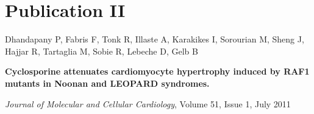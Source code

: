 \chapter*{Publication II}
\label{pubIIpage}
\vfill
Dhandapany P, Fabris F, Tonk R, Illaste A, Karakikes I, Sorourian M,
Sheng J, Hajjar R, Tartaglia M, Sobie R, Lebeche D,  Gelb B

{\bf Cyclosporine attenuates cardiomyocyte hypertrophy induced by RAF1
mutants in Noonan and LEOPARD syndromes.}

\emph{Journal of Molecular and Cellular Cardiology}, Volume 51, Issue 1, July 2011

\vfill

\renewcommand{\thepaper}{\PaperII}
\pagebreak
\vspace*{3cm}\thispagestyle{empty}
\pagebreak

\newcommand{\PIFA}{\PFref{I}{8}{1}\xspace}


